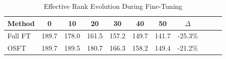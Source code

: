 \begin{table}[t]
\caption{Effective Rank Evolution During Fine-Tuning}
\label{tab:svd_dynamics}
\begin{tabular}{lcccccccccc}
\toprule
Method & 0 & 10 & 20 & 30 & 40 & 50 & $\Delta$ \\
\midrule
Full FT & 189.7 & 178.0 & 161.5 & 157.2 & 149.7 & 141.7 & -25.3\% \\
OSFT & 189.7 & 189.5 & 180.7 & 166.3 & 158.2 & 149.4 & -21.2\% \\
\bottomrule
\end{tabular}
\end{table}